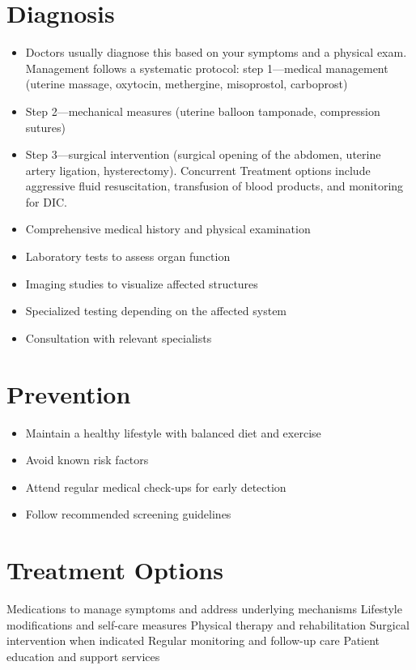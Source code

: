 \section{Diagnosis}
\begin{itemize}[noitemsep]
  \item Doctors usually diagnose this based on your symptoms and a physical exam. Management follows a systematic protocol: step 1---medical management (uterine massage, oxytocin, methergine, misoprostol, carboprost)
  \item Step 2---mechanical measures (uterine balloon tamponade, compression sutures)
  \item Step 3---surgical intervention (surgical opening of the abdomen, uterine artery ligation, hysterectomy). Concurrent Treatment options include aggressive fluid resuscitation, transfusion of blood products, and monitoring for DIC.
  \item Comprehensive medical history and physical examination
  \item Laboratory tests to assess organ function
  \item Imaging studies to visualize affected structures
  \item Specialized testing depending on the affected system
  \item Consultation with relevant specialists
\end{itemize}
\section{Prevention}
\begin{itemize}[noitemsep]
  \item Maintain a healthy lifestyle with balanced diet and exercise
  \item Avoid known risk factors
  \item Attend regular medical check-ups for early detection
  \item Follow recommended screening guidelines
\end{itemize}
\section{Treatment Options}
Medications to manage symptoms and address underlying mechanisms Lifestyle modifications and self-care measures Physical therapy and rehabilitation Surgical intervention when indicated Regular monitoring and follow-up care Patient education and support services

